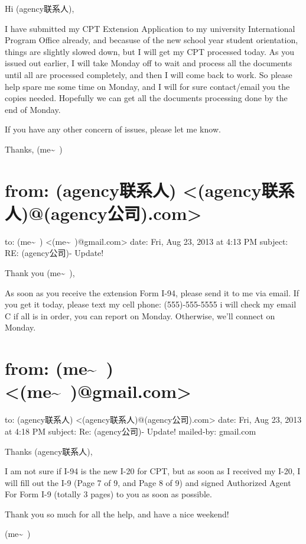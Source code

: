 \documentclass[12pt]{book}
\begin{document}
Hi (agency联系人), 

I have submitted my CPT Extension Application to my university International Program Office already, and becasuse of the new school year student orientation, things are slightly slowed down, but I will get my CPT processed today. As you issued out earlier, I will take Monday off to wait and process all the documents until all are processed completely, and then I will come back to work. So please help spare me some time on Monday, and I will for sure contact/email you the copies needed. Hopefully we can get all the documents processing done by the end of Monday. 

If you have any other concern of issues, please let me know. 

Thanks,
(me\textasciitilde{}~)


\section{from:         (agency联系人) <(agency联系人)@(agency公司).com>}
\label{sec-35-15}
to:         (me\textasciitilde{}~) <(me\textasciitilde{}~)@gmail.com>
date:         Fri, Aug 23, 2013 at 4:13 PM
subject:         RE: (agency公司)- Update!

Thank you (me\textasciitilde{}~),

As soon as you receive the extension Form I-94, please send it to me via email. If you get it today, please text my cell phone: (555)-555-5555
i will check my email C if all is in order, you can report on Monday. Otherwise, we’ll connect on Monday.


\section{from:         (me\textasciitilde{}~) <(me\textasciitilde{}~)@gmail.com>}
\label{sec-35-16}
to:         (agency联系人) <(agency联系人)@(agency公司).com>
date:         Fri, Aug 23, 2013 at 4:18 PM
subject:         Re: (agency公司)- Update!
mailed-by:         gmail.com

Thanks (agency联系人), 

I am not sure if I-94 is the new I-20 for CPT, but as soon as I received my I-20, I will fill out the I-9 (Page 7 of 9, and Page 8 of 9) and signed Authorized Agent For Form I-9 (totally 3 pages) to you as soon as possible. 

Thank you so much for all the help, and have a nice weekend!

(me\textasciitilde{}~)
\end{document}
